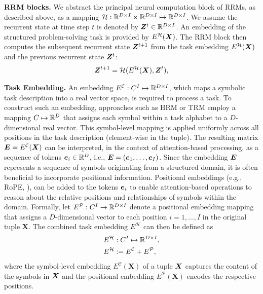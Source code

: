 \documentclass{article}
\theoremstyle{plain}
\theoremstyle{definition}
\theoremstyle{remark}
\renewcommand{\paragraph}[1]{\textbf{#1}\;}
\begin{document}
\paragraph{RRM blocks.} We abstract the principal neural computation block of RRMs, as described above, as a mapping $\mathcal H: \mathbb{R}^{D \times I} \times \mathbb{R}^{D \times I} \mapsto \mathbb{R}^{D \times I}$. We assume the recurrent state at time step $t$ is denoted by  $\bm{Z}^t \in \mathbb{R}^{D \times I}$. An embedding of the structured problem-solving task is provided by $E^{\mathcal H}(\bm{X})$. The RRM block then computes the subsequent recurrent state \(\bm{Z}^{t+1}\) from the task embedding $E^{\mathcal H}(\bm{X})$ and the previous recurrent state $\bm{Z}^{t}$:
\begin{align} 
\bm{Z}^{t+1} = \mathcal H(E^{\mathcal H}(\bm{X}), \bm{Z}^t), \label{RRMfp}
\end{align}

\paragraph{Task Embedding.} An embedding  $E^{\mathcal C}: C^I \mapsto \mathbb{R}^{D \times I}$, which maps a symbolic task description into a real vector space, is required to process a task.
To construct such an embedding, approaches such as HRM or TRM employ a mapping $C \mapsto \mathbb{R}^D$ that assigns each symbol within a task alphabet to a \(D\)-dimensional real vector.
This symbol-level mapping is applied uniformly across all positions in the task description (element-wise in the tuple).
The resulting matrix $\bm{E}=E^{\mathcal C}(\bm{X})$ can be interpreted, in the context of attention-based processing, as a sequence of tokens $\bm{e}_i \in \mathbb{R}^D$, i.e., $\bm{E}=(\bm{e}_1,\ldots,\bm{e}_I)$.
Since the embedding $\bm{E}$ represents a sequence of symbols originating from a structured domain, it is often beneficial to incorporate positional information. Positional embeddings (e.g., RoPE, \citet{su2024roformer}), can be added to the tokens $\bm{e}_i$ to enable attention-based operations to reason about the relative positions and relationships of symbols within the domain.
Formally, let $E^{\mathcal P}: C^I \to \mathbb{R}^{D \times I}$ denote a positional embedding mapping that assigns a $D$-dimensional vector to each position $i = 1, \dots, I$ in the original tuple $\mathbf{X}$. The combined task embedding $E^{\mathcal H}$ can then be defined as
\begin{align}
&E^{\mathcal H} :  C^I \mapsto \mathbb{R}^{D \times I},\\
&E^{\mathcal H} := E^{\mathcal C} + E^{\mathcal P}\nonumber,
\end{align}
where the symbol-level embedding $E^{\mathcal C}(\mathbf{X})$ of a tuple $\bm{X}$ captures the content of the symbols in $\bm{X}$ and the positional embedding $E^{\mathcal P}(\mathbf{X})$ encodes the respective positions.
\end{document}

